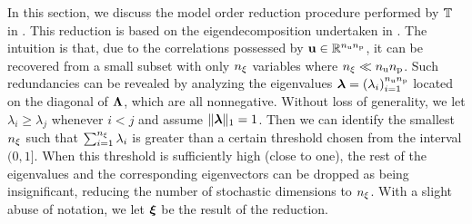 In this section, we discuss the model order reduction procedure performed by $\transformation$ in .
This reduction is based on the eigendecomposition undertaken in .
The intuition is that, due to the correlations possessed by $\vu \in \real^{\nparams \nprocs}$, it can be recovered from a small subset with only $\nvars$ variables where $\nvars \ll \nparams \nprocs$.
Such redundancies can be revealed by analyzing the eigenvalues $\dimensionContribution = (\lambda_i)_{i = 1}^{\nparams \nprocs}$ located on the diagonal of $\mEDL$, which are all nonnegative.
Without loss of generality, we let $\lambda_i \geq \lambda_j$ whenever $i < j$ and assume $\norm[1]{\dimensionContribution} = 1$.
Then we can identify the smallest $\nvars$ such that $\sum_{i = 1}^\nvars \lambda_i$ is greater than a certain threshold chosen from the interval $(0, 1]$.
When this threshold is sufficiently high (close to one), the rest of the eigenvalues and the corresponding eigenvectors can be dropped as being insignificant, reducing the number of stochastic dimensions to $\nvars$.
With a slight abuse of notation, we let $\vz$ be the result of the reduction.
